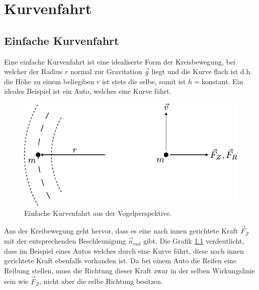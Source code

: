 



\chapter{Kurvenfahrt}

\newpage

\section{Einfache Kurvenfahrt}
Eine einfache Kurvenfahrt ist eine idealiserte Form der Kreisbewegung,
bei welcher der Radius $r$ normal zur Gravitation $\vec{g}$ liegt und
die Kurve flach ist d.h. die Höhe zu einem beliegiben $r$ ist stets die
selbe, somit ist $h=$konstant. 
Ein ideales Beispiel ist ein Auto, welches eine Kurve fährt.

\begin{figure}[h!]
	\centering
	\includegraphics[scale=0.8]{kurve3.pdf}
	\caption{Einfache Kurvenfahrt aus der Vogelperspektive.}
	\label{fig:kurvenfahrt}
\end{figure}

\noindent
Aus der Kreibewegung geht hervor, dass es eine nach innen gerichtete
Kraft $\vec{F}_Z$ mit der entsprechenden Beschleunigung $\vec{a}_{rad}$
gibt. Die Grafik \ref{fig:kurvenfahrt} verdeutlicht, dass im Beispiel 
eines Autos welches durch eine Kurve fährt, diese nach innen gerichtete 
Kraft ebenfalls vorhanden ist. Da bei einem Auto die Reifen eine Reibung 
stellen, muss die Richtung dieser Kraft zwar in der selben Wirkungslinie
sein wie $\vec{F}_Z$, nicht aber die selbe Richtung besitzen.  

